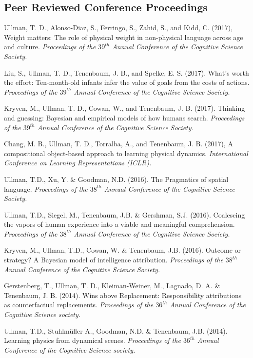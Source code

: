 \documentclass[margin,line,pifont,palatino,courier]{res}
\begin{document}
\begin{resume}
\section{\sc Peer Reviewed Conference Proceedings}

Ullman, T. D., Alonso-Diaz, S., Ferringo, S., Zahid, S., and Kidd, C. (2017), Weight matters: The role of physical weight in non-physical language across age and culture. \textit{Proceedings of the $39^{th}$ Annual Conference of the Cognitive Science Society.}

Liu, S., Ullman, T. D., Tenenbaum, J. B., and Spelke, E. S. (2017). What's worth the effort: Ten-month-old infants infer the value of goals from the costs of actions. \textit{Proceedings of the $39^{th}$ Annual Conference of the Cognitive Science Society.}

Kryven, M., Ullman, T. D., Cowan, W., and Tenenbaum, J. B. (2017). Thinking and guessing: Bayesian and empirical models of how humans search. \textit{Proceedings of the $39^{th}$ Annual Conference of the Cognitive Science Society.}

Chang, M. B., Ullman, T. D., Torralba, A., and Tenenbaum, J. B. (2017), A compositional object-based approach to learning physical dynamics. \textit{International Conference on Learning Representations (ICLR).}

Ullman, T.D., Xu, Y. \& Goodman, N.D. (2016). The Pragmatics of spatial language. \textit{Proceedings of the $38^{th}$ Annual Conference of the Cognitive Science Society.}

Ullman, T.D., Siegel, M., Tenenbaum, J.B. \& Gershman, S.J. (2016). Coalescing the vapors of human experience into a viable and meaningful comprehension. \textit{Proceedings of the $38^{th}$ Annual Conference of the Cognitive Science Society.}

Kryven, M., Ullman, T.D., Cowan, W. \& Tenenbaum, J.B. (2016). Outcome or strategy? A Bayesian model of intelligence attribution. \textit{Proceedings of the $38^{th}$ Annual Conference of the Cognitive Science Society.}

Gerstenberg, T., Ullman, T. D., Kleiman-Weiner, M., Lagnado, D. A. \& Tenenbaum, J. B. (2014). Wins above Replacement: Responsibility attributions as counterfactual replacements. \textit{Proceedings of the $36^{th}$ Annual Conference of the Cognitive Science society.}

Ullman, T.D., Stuhlm{\"u}ller A., Goodman, N.D. \& Tenenbaum, J.B. (2014). Learning physics from dynamical scenes. \textit{Proceedings of the $36^{th}$ Annual Conference of the Cognitive Science society.}


\end{resume}
\end{document}
